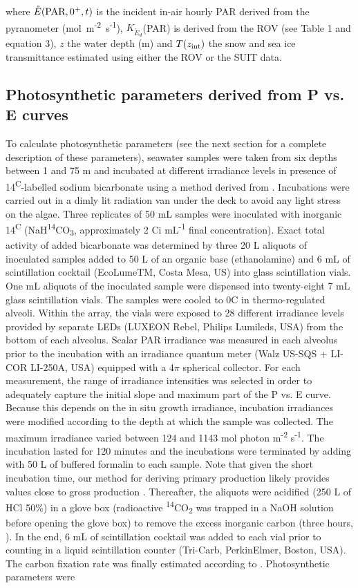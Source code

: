 \documentclass[draft]{agujournal2018}
\newcommand{\kdparscalar}{\ensuremath{K_{\mathring{E}_d}}(\textnormal{PAR})}
\newcommand{\eparzeroscalar}{\ensuremath{\mathring{E}(\textnormal{PAR}, 0^+, t)}}
\newcommand{\micromol}{\textmu mol~m\textsuperscript{-2}~s\textsuperscript{-1}}
\begin{document}
\noindent where \eparzeroscalar{} is the incident in-air hourly PAR derived from the pyranometer (\micromol{}), \kdparscalar{} is derived from the ROV (see Table 1 and equation 3), $z$ the water depth (m) and $T(z_{\textnormal{int}})$ the snow and sea ice transmittance estimated using either the ROV or the SUIT data.

\subsection{Photosynthetic parameters derived from P vs. E curves}

To calculate photosynthetic parameters (see the next section for a complete description of these parameters), seawater samples were taken from six depths between 1 and 75 m and incubated at different irradiance levels in presence of 14\textsuperscript{C}-labelled sodium bicarbonate using a method derived from \citet{Lewis1983}. Incubations were carried out in a dimly lit radiation van under the deck to avoid any light stress on the algae. Three replicates of 50 mL samples were inoculated with inorganic 14\textsuperscript{C} (NaH\textsuperscript{14}CO\textsubscript{3}, approximately 2 \textmu Ci mL\textsuperscript{-1} final concentration). Exact total activity of added bicarbonate was determined by three 20 \textmu L aliquots of inoculated samples added to 50 \textmu L of an organic base (ethanolamine) and 6 mL of scintillation cocktail (EcoLumeTM, Costa Mesa, US) into glass scintillation vials. One mL aliquots of the inoculated sample were dispensed into twenty-eight 7 mL glass scintillation vials. The samples were cooled to 0\textdegree{}C in thermo-regulated alveoli. Within the array, the vials were exposed to 28 different irradiance levels provided by separate LEDs (LUXEON Rebel, Philips Lumileds, USA) from the bottom of each alveolus. Scalar PAR irradiance was measured in each alveolus prior to the incubation with an irradiance quantum meter (Walz US-SQS + LI-COR LI-250A, USA) equipped with a 4$\pi$ spherical collector. For each measurement, the range of irradiance intensities was selected in order to adequately capture the initial slope and maximum part of the P vs. E curve. Because this depends on the in situ growth irradiance, incubation irradiances were modified according to the depth at which the sample was collected. The maximum irradiance varied between 124 and 1143 \textmu mol photon m\textsuperscript{-2} s\textsuperscript{-1}. The incubation lasted for 120 minutes and the incubations were terminated by adding with 50 \textmu L of buffered formalin to each sample. Note that given the short incubation time, our method for deriving primary production likely provides values close to gross production \citep{Lewis1983}. Thereafter, the aliquots were acidified (250 \textmu L of HCl 50\%) in a glove box (radioactive \textsuperscript{14}CO\textsubscript{2} was trapped in a NaOH solution before opening the glove box) to remove the excess inorganic carbon (three hours, \citet{Knap1996}). In the end, 6 mL of scintillation cocktail was added to each vial prior to counting in a liquid scintillation counter (Tri-Carb, PerkinElmer, Boston, USA). The carbon fixation rate was finally estimated according to \citet{Parsons1984}. Photosynthetic parameters were 
\end{document}
